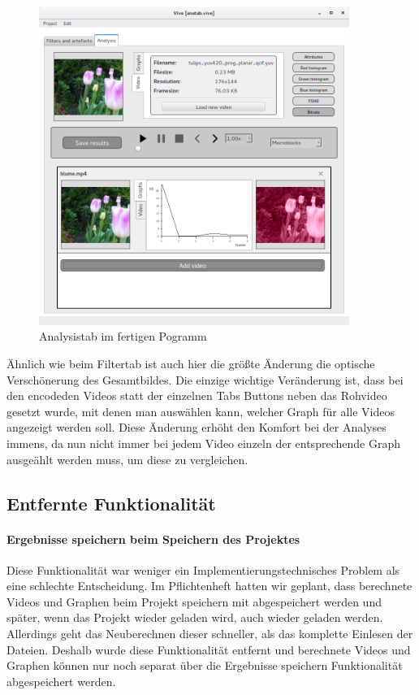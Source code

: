 \documentclass{scrartcl}
\begin{document}
{\begin{figure}[ht]
\includegraphics[width=0.9\textwidth]{Pictures/analysistabneu.png}
\caption{Analysistab im fertigen Pogramm}
\end{figure}
Ähnlich wie beim Filtertab ist auch hier die größte Änderung die optische Verschönerung des Gesamtbildes. Die einzige wichtige Veränderung ist, dass bei den encodeden Videos statt der einzelnen Tabs Buttons neben das Rohvideo gesetzt wurde, mit denen man auswählen kann, welcher Graph für alle Videos angezeigt werden soll. Diese Änderung erhöht den Komfort bei der Analyses immens, da nun nicht immer bei jedem Video einzeln der entsprechende Graph ausgeählt werden muss, um diese zu vergleichen.
\newpage
\hfill
\newpage
\subsection{Entfernte Funktionalität}
\bigskip
\paragraph{Ergebnisse speichern beim Speichern des Projektes} Diese Funktionalität war weniger ein Implementierungstechnisches Problem als eine schlechte Entscheidung. Im Pflichtenheft hatten wir geplant, dass berechnete Videos und Graphen beim Projekt speichern mit abgespeichert werden und später, wenn das Projekt wieder geladen wird, auch wieder geladen werden. Allerdings geht das Neuberechnen dieser schneller, als das komplette Einlesen der Dateien. Deshalb wurde diese Funktionalität entfernt und berechnete Videos und Graphen können nur noch separat über die Ergebnisse speichern Funktionalität abgespeichert werden.
}
\end{document}
